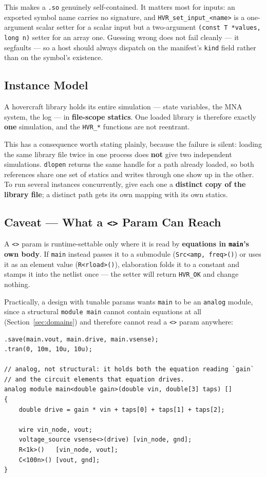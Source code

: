 \documentclass[11pt, a4paper]{article}
\newcommand{\code}[1]{\texttt{\small #1}}
\begin{document}
This makes a \code{.so} genuinely self-contained. It matters most for inputs: an
exported symbol name carries no signature, and \code{HVR\_set\_input\_<name>}
is a one-argument scalar setter for a scalar input but a two-argument
\code{(const T *values, long n)} setter for an array one. Guessing wrong does
not fail cleanly --- it segfaults --- so a host should always dispatch on the
manifest's \code{kind} field rather than on the symbol's existence.

\subsection{Instance Model}

A hovercraft library holds its entire simulation --- state variables, the MNA
system, the log --- in \textbf{file-scope statics}. One loaded library is
therefore exactly \textbf{one} simulation, and the \code{HVR\_*} functions are
not reentrant.

This has a consequence worth stating plainly, because the failure is silent:
loading the same library file twice in one process does \textbf{not} give two
independent simulations. \code{dlopen} returns the same handle for a path
already loaded, so both references share one set of statics and writes through
one show up in the other. To run several instances concurrently, give each one
a \textbf{distinct copy of the library file}; a distinct path gets its own
mapping with its own statics.

\subsection{Caveat --- What a \code{<>} Param Can Reach}
\label{sec:hovercraftcaveat}

A \code{<>} param is runtime-settable only where it is read by
\textbf{equations in \code{main}'s own body}. If \code{main} instead passes it
to a submodule (\code{Src<amp, freq>()}) or uses it as an element value
(\code{R<rload>()}), elaboration folds it to a constant and stamps it into the
netlist once --- the setter will return \code{HVR\_OK} and change nothing.

Practically, a design with tunable params wants \code{main} to be an
\code{analog} module, since a structural \code{module main} cannot contain
equations at all (Section~\ref{sec:domains}) and therefore cannot read a
\code{<>} param anywhere:

\begin{lstlisting}
.save(main.vout, main.drive, main.vsense);
.tran(0, 10m, 10u, 10u);

// analog, not structural: it holds both the equation reading `gain`
// and the circuit elements that equation drives.
analog module main<double gain>(double vin, double[3] taps) []
{
    double drive = gain * vin + taps[0] + taps[1] + taps[2];

    wire vin_node, vout;
    voltage_source vsense<>(drive) [vin_node, gnd];
    R<1k>()   [vin_node, vout];
    C<100n>() [vout, gnd];
}
\end{lstlisting}
\end{document}

